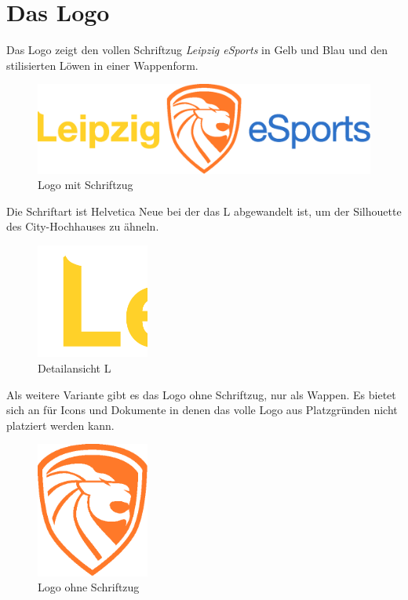 \documentclass{article}
\begin{document}
\cleardoublepage
\section{Das Logo}

Das Logo zeigt den vollen Schriftzug \emph{Leipzig eSports} in Gelb und Blau und den stilisierten Löwen in einer Wappenform.
\begin{figure}[H]
\includegraphics[width=\textwidth]{Docs/Logo.eps}
\caption{Logo mit Schriftzug}
\end{figure}

Die Schriftart ist Helvetica Neue bei der das L abgewandelt ist, um der Silhouette des City-Hochhauses zu ähneln.

\begin{figure}[H]
\centering
\includegraphics[width=0.33\textwidth]{Docs/logo_detail_L.png}
\caption{Detailansicht L}
\end{figure}


Als weitere Variante gibt es das Logo ohne Schriftzug, nur als Wappen. Es bietet sich an für Icons und Dokumente in denen das volle Logo aus Platzgründen nicht platziert werden kann.

\begin{figure}[H]
\centering
\includegraphics[width=0.33\textwidth]{Docs/Emblem.eps}
\caption{Logo ohne Schriftzug}
\end{figure}
\end{document}
